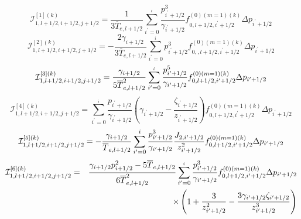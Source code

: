 \begin{equation}
\mathcal{I}_{1,l+1/2,i+1/2,j+1/2}^{\left[ 1\right] \left( k\right) }=\frac{1%
}{3\overline{T}_{e,l+1/2}}\sum_{i^{\prime }=0}^{_{i}}\frac{p_{i^{\prime
}+1/2}^{3}}{\gamma _{i^{\prime }+1/2}}f_{0,l+1/2,i^{\prime }+1/2}^{\left(
0\right) \left( m=1\right) \left( k\right) }\Delta p_{i^{\prime }+1/2}
\end{equation}
\begin{equation}
\mathcal{I}_{1,l+1/2,i+1/2,j+1/2}^{\left[ 2\right] \left( k\right) }=-\frac{
2\gamma _{i+1/2}}{3\overline{T}_{e,l+1/2}}\sum_{i^{\prime
}=0}^{_{i}}p_{i^{\prime }+1/2}^{3}f_{0,,l+1/2,i^{\prime }+1/2}^{\left(
0\right) \left( m=1\right) \left( k\right) }\Delta p_{i^{\prime }+1/2}
\end{equation}
\begin{equation}
\mathcal{I}_{1,l+1/2,i+1/2,j+1/2}^{\left[ 3\right] \left( k\right) }=\frac{
\gamma _{i+1/2}}{5\overline{T}_{e,l+1/2}^{2}}\sum_{i^{\prime }=0}^{_{i}}%
\frac{p_{i^{\prime }+1/2}^{5}}{\gamma _{i^{\prime }+1/2}}f_{0,l+1/2,i^{%
\prime }+1/2}^{\left( 0\right) \left( m=1\right) \left( k\right) }\Delta
p_{i^{\prime }+1/2}
\end{equation}
\begin{equation}
\mathcal{I}_{1,l+1/2,i+1/2,j+1/2}^{\left[ 4\right] \left( k\right)
}=\sum_{i^{\prime }=0}^{_{i}}\frac{p_{i^{\prime }+1/2}}{\gamma _{i^{\prime
}+1/2}}\left( \gamma _{i^{\prime }+1/2}-\frac{\zeta _{i^{\prime }+1/2}}{
z_{i^{\prime }+1/2}}\right) f_{0,l+1/2,i^{\prime }+1/2}^{\left( 0\right)
\left( m=1\right) \left( k\right) }\Delta p_{i^{\prime }+1/2}
\end{equation}
\begin{equation}
\mathcal{I}_{1,l+1/2,i+1/2,j+1/2}^{\left[ 5\right] \left( k\right) }=-\frac{
\gamma _{i+1/2}}{\overline{T}_{e,l+1/2}}\sum_{i^{\prime }=0}^{i}\frac{%
p_{i^{\prime }+1/2}^{3}}{\gamma _{i^{\prime }+1/2}}\frac{J_{2,i^{\prime
}+1/2}}{z_{i^{\prime }+1/2}^{2}}f_{0,l+1/2,i^{\prime }+1/2}^{\left( 0\right)
\left( m=1\right) \left( k\right) }\Delta p_{i^{\prime }+1/2}
\end{equation}
\begin{eqnarray}
\mathcal{I}_{1,l+1/2,i+1/2,j+1/2}^{\left[ 6\right] \left( k\right) } &=&%
\frac{\gamma _{i+1/2}p_{i+1/2}^{2}-5\overline{T}_{e,l+1/2}}{6\overline{T}
_{e,l+1/2}^{2}}\sum_{i^{\prime }=0}^{_{i}}\frac{p_{i^{\prime }+1/2}^{3}}{%
\gamma _{i^{\prime }+1/2}}f_{0,l+1/2,i^{\prime }+1/2}^{\left( 0\right)
\left( m=1\right) \left( k\right) }\Delta p_{i^{\prime }+1/2}  \nonumber \\
&&\times \left( 1+\frac{3}{z_{i^{\prime }+1/2}^{2}}-\frac{3\gamma
_{i^{\prime }+1/2}\zeta _{i^{\prime }+1/2}}{z_{i^{\prime }+1/2}^{3}}\right)
\end{eqnarray}
